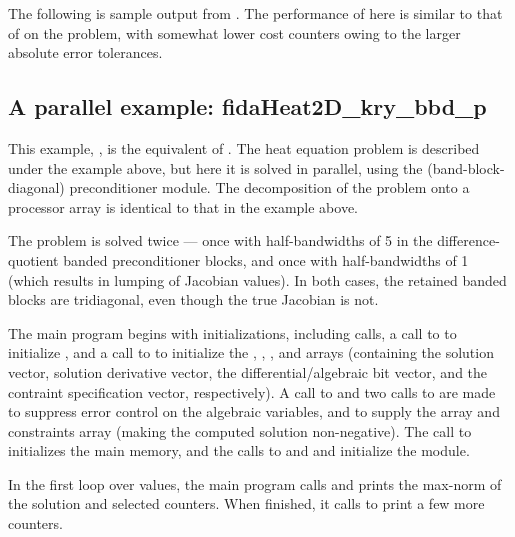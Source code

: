 The following is sample output from .
The performance of {\fida} here is similar to that of {\ida} on
the  problem, with somewhat lower cost counters owing to
the larger absolute error tolerances.



\subsection{A parallel example: fidaHeat2D\_kry\_bbd\_p}\label{ss:fidaHeat2D_bbd_p}

This example, , is the {\F} equivalent of
.  The heat equation problem is described
under the  example above, but here it is solved in
parallel, using the {\idabbdpre} (band-block-diagonal) preconditioner
module.  The decomposition of the problem onto a processor array is
identical to that in the  example above.

The problem is solved twice --- once with half-bandwidths of 5 in the
difference-quotient banded preconditioner blocks, and once with
half-bandwidths of 1 (which results in lumping of Jacobian values).
In both cases, the retained banded blocks are tridiagonal, even though
the true Jacobian is not.

The main program begins with initializations, including {\mpi} calls,
a call to  to initialize {\nvecp}, and a call to
 to initialize the , , , and
 arrays (containing the solution vector, solution derivative vector,
the differential/algebraic bit vector, and the contraint specification
vector, respectively).  A call to  and two calls to
 are made to suppress error control on the algebraic
variables, and to supply the  array and constraints array (making
the computed solution non-negative).  The call to 
initializes the {\fida} main memory, and the calls to  and
 and initialize the {\fidabbd} module.

In the first loop over  values, the main program calls 
and prints the max-norm of the solution and selected counters.  When finished,
it calls  to print a few more counters.

